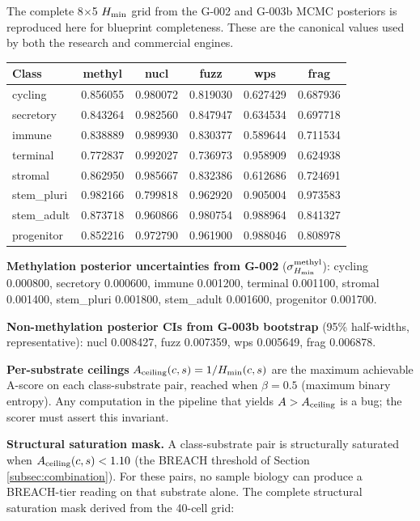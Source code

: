 \documentclass[12pt,a4paper]{article}
\begin{document}
The complete 8$\times$5 $H_{\rm min}$ grid from the G-002 and G-003b
MCMC posteriors is reproduced here for blueprint completeness. These
are the canonical values used by both the research and commercial
engines.

\begin{center}
\renewcommand{\arraystretch}{1.15}
\footnotesize
\begin{tabular}{lccccc}
\toprule
\textbf{Class} & \textbf{methyl} & \textbf{nucl} & \textbf{fuzz} & \textbf{wps} & \textbf{frag} \\
\midrule
cycling    & 0.856055 & 0.980072 & 0.819030 & 0.627429 & 0.687936 \\
secretory  & 0.843264 & 0.982560 & 0.847947 & 0.634534 & 0.697718 \\
immune     & 0.838889 & 0.989930 & 0.830377 & 0.589644 & 0.711534 \\
terminal   & 0.772837 & 0.992027 & 0.736973 & 0.958909 & 0.624938 \\
stromal    & 0.862950 & 0.985667 & 0.832386 & 0.612686 & 0.724691 \\
stem\_pluri & 0.982166 & 0.799818 & 0.962920 & 0.905004 & 0.973583 \\
stem\_adult & 0.873718 & 0.960866 & 0.980754 & 0.988964 & 0.841327 \\
progenitor & 0.852216 & 0.972790 & 0.961900 & 0.988046 & 0.808978 \\
\bottomrule
\end{tabular}
\end{center}

\textbf{Methylation posterior uncertainties from G-002} ($\sigma_{H_{\rm min}}^{\rm methyl}$):
cycling 0.000800, secretory 0.000600, immune 0.001200, terminal 0.001100,
stromal 0.001400, stem\_pluri 0.001800, stem\_adult 0.001600,
progenitor 0.001700.

\textbf{Non-methylation posterior CIs from G-003b bootstrap}
(95\% half-widths, representative): nucl 0.008427, fuzz 0.007359,
wps 0.005649, frag 0.006878.

\textbf{Per-substrate ceilings} $A_{\rm ceiling}(c,s) = 1/H_{\rm min}(c,s)$
are the maximum achievable A-score on each class-substrate pair, reached
when $\beta = 0.5$ (maximum binary entropy). Any computation in the
pipeline that yields $A > A_{\rm ceiling}$ is a bug; the scorer must
assert this invariant.

\textbf{Structural saturation mask.} A class-substrate pair is
structurally saturated when $A_{\rm ceiling}(c,s) < 1.10$ (the BREACH
threshold of Section \ref{subsec:combination}). For these pairs, no
sample biology can produce a BREACH-tier reading on that substrate
alone. The complete structural saturation mask derived from the
40-cell grid:
\end{document}
